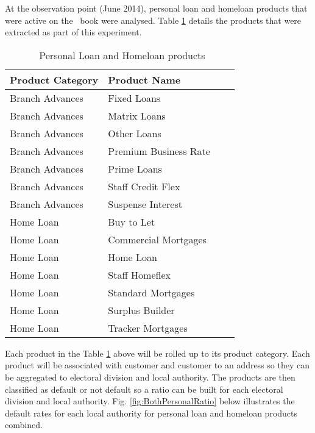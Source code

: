 At the observation point (June 2014), personal loan and homeloan products that were active on the \subjectname\ book were analysed. Table \ref{table:AIB_Products} details the products that were extracted as part of this experiment.

\begin{table}[H]
	\centering
		\small
			\begin{tabular}{|l|l|l|l|}
			\hline
			\textbf{Product Category} & \textbf{Product Name} \\ \hline
			Branch Advances     & Fixed Loans \\ \hline
			Branch Advances     & Matrix Loans \\ \hline
			Branch Advances     & Other Loans \\ \hline
			Branch Advances     & Premium Business Rate \\ \hline
			Branch Advances     & Prime Loans \\ \hline
			Branch Advances     & Staff Credit Flex \\ \hline
			Branch Advances		& Suspense Interest \\ \hline
			Home Loan           & Buy to Let \\ \hline
			Home Loan           & Commercial Mortgages \\ \hline
			Home Loan           & Home Loan \\ \hline
			Home Loan           & Staff Homeflex \\ \hline
			Home Loan           & Standard Mortgages \\ \hline	
			Home Loan           & Surplus Builder \\ \hline		
			Home Loan           & Tracker Mortgages \\ \hline		
		\end{tabular}
	\caption{\subjectname\ Personal Loan and Homeloan products}
	\label{table:AIB_Products}
\end{table}

Each product in the Table \ref{table:AIB_Products} above will be rolled up to its product category. Each product will be associated with customer and customer to an address so they can be aggregated to electoral division and local authority. The products are then classified as default or not default so a ratio can be built for each electoral division and local authority. Fig. \ref{fig:BothPersonalRatio} below illustrates the default rates for each local authority for personal loan and homeloan products combined. 

